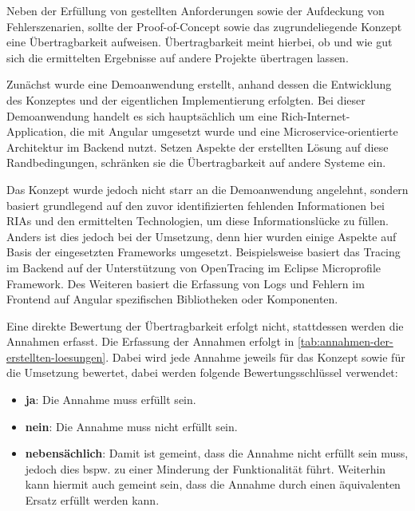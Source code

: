 
Neben der Erfüllung von gestellten Anforderungen sowie der Aufdeckung von Fehlerszenarien, sollte der Proof-of-Concept sowie das zugrundeliegende Konzept eine Übertragbarkeit aufweisen. Übertragbarkeit meint hierbei, ob und wie gut sich die ermittelten Ergebnisse auf andere Projekte übertragen lassen.

Zunächst wurde eine Demoanwendung erstellt, anhand dessen die Entwicklung des Konzeptes und der eigentlichen Implementierung erfolgten. Bei dieser Demoanwendung handelt es sich hauptsächlich um eine Rich-Internet-Application, die mit Angular umgesetzt wurde und eine Microservice-orientierte Architektur im Backend nutzt. Setzen Aspekte der erstellten Lösung auf diese Randbedingungen, schränken sie die Übertragbarkeit auf andere Systeme ein.

Das Konzept wurde jedoch nicht starr an die Demoanwendung angelehnt, sondern basiert grundlegend auf den zuvor identifizierten fehlenden Informationen bei RIAs und den ermittelten Technologien, um diese Informationslücke zu füllen. Anders ist dies jedoch bei der Umsetzung, denn hier wurden einige Aspekte auf Basis der eingesetzten Frameworks umgesetzt. Beispielsweise basiert das Tracing im Backend auf der Unterstützung von OpenTracing im Eclipse Microprofile Framework. Des Weiteren basiert die Erfassung von Logs und Fehlern im Frontend auf Angular spezifischen Bibliotheken oder Komponenten.

Eine direkte Bewertung der Übertragbarkeit erfolgt nicht, stattdessen werden die Annahmen erfasst. Die Erfassung der Annahmen erfolgt in \autoref{tab:annahmen-der-erstellten-loesungen}. Dabei wird jede Annahme jeweils für das Konzept sowie für die Umsetzung bewertet, dabei werden folgende Bewertungsschlüssel verwendet:

\begin{itemize}
	\item \textbf{ja}: Die Annahme muss erfüllt sein.
	\item \textbf{nein}: Die Annahme muss nicht erfüllt sein.
	\item \textbf{nebensächlich}: Damit ist gemeint, dass die Annahme nicht erfüllt sein muss, jedoch dies bspw. zu einer Minderung der Funktionalität führt. Weiterhin kann hiermit auch gemeint sein, dass die Annahme durch einen äquivalenten Ersatz erfüllt werden kann.
\end{itemize}

